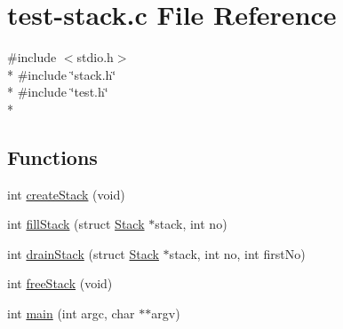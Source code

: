 \hypertarget{test-stack_8c}{\section{test-\/stack.c File Reference}
\label{test-stack_8c}
}
{\ttfamily \#include $<$stdio.\+h$>$}\\*
{\ttfamily \#include \char`\"{}stack.\+h\char`\"{}}\\*
{\ttfamily \#include \char`\"{}test.\+h\char`\"{}}\\*
\subsection*{Functions}
\begin{DoxyCompactItemize}
\item 
int \hyperlink{test-stack_8c_a758dde005e8e3325738b0c3fa33d5c06}{create\+Stack} (void)
\item 
int \hyperlink{test-stack_8c_a0bcbd5859cd3077b9d3ced958e3d93cc}{fill\+Stack} (struct \hyperlink{structStack}{Stack} $\ast$stack, int no)
\item 
int \hyperlink{test-stack_8c_aca9e4b9eef5e2fbf0e2d0e80d6364413}{drain\+Stack} (struct \hyperlink{structStack}{Stack} $\ast$stack, int no, int first\+No)
\item 
int \hyperlink{test-stack_8c_a32af24c00f4a08b2014bf6ce350f5f14}{free\+Stack} (void)
\item 
int \hyperlink{test-stack_8c_a3c04138a5bfe5d72780bb7e82a18e627}{main} (int argc, char $\ast$$\ast$argv)
\end{DoxyCompactItemize}


